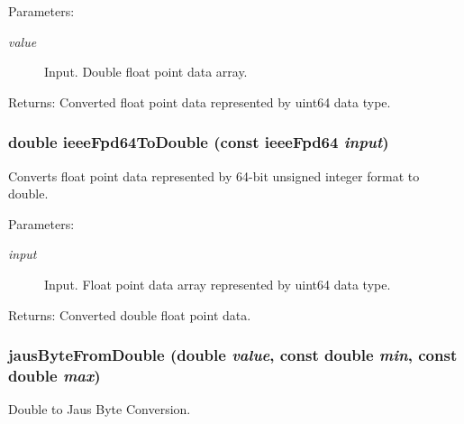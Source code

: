 \begin{Desc}
\item[Parameters:]
\begin{description}
\item[{\em value}]Input. Double float point data array.\end{description}
\end{Desc}
\begin{Desc}
\item[Returns:]Converted float point data represented by uint64 data type. \end{Desc}
\hypertarget{group__data__conv_g170f0ab594dab1c4db01008624225f59}{
\subsubsection[ieeeFpd64ToDouble]{\setlength{\rightskip}{0pt plus 5cm}double ieeeFpd64ToDouble (const {\bf ieeeFpd64} {\em input})}}
\label{group__data__conv_g170f0ab594dab1c4db01008624225f59}


Converts float point data represented by 64-bit unsigned integer format to double. 

\begin{Desc}
\item[Parameters:]
\begin{description}
\item[{\em input}]Input. Float point data array represented by uint64 data type.\end{description}
\end{Desc}
\begin{Desc}
\item[Returns:]Converted double float point data. \end{Desc}
\hypertarget{group__data__conv_g0d27787fcd35af9939ffbf853b2c0349}{
\subsubsection[jausByteFromDouble]{ jausByteFromDouble (double {\em value}, \/  const double {\em min}, \/  const double {\em max})}}
\label{group__data__conv_g0d27787fcd35af9939ffbf853b2c0349}


Double to Jaus Byte Conversion. 

